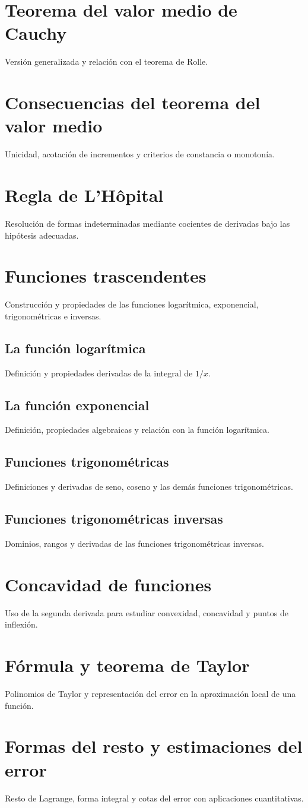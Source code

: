 \section{Teorema del valor medio de Cauchy}
Versión generalizada y relación con el teorema de Rolle.

\section{Consecuencias del teorema del valor medio}
Unicidad, acotación de incrementos y criterios de constancia o monotonía.

\section{Regla de L'Hôpital}
Resolución de formas indeterminadas mediante cocientes de derivadas bajo las hipótesis adecuadas.

\section{Funciones trascendentes}
Construcción y propiedades de las funciones logarítmica, exponencial, trigonométricas e inversas.

\subsection{La función logarítmica}
Definición y propiedades derivadas de la integral de $1/x$.

\subsection{La función exponencial}
Definición, propiedades algebraicas y relación con la función logarítmica.

\subsection{Funciones trigonométricas}
Definiciones y derivadas de seno, coseno y las demás funciones trigonométricas.

\subsection{Funciones trigonométricas inversas}
Dominios, rangos y derivadas de las funciones trigonométricas inversas.

\section{Concavidad de funciones}
Uso de la segunda derivada para estudiar convexidad, concavidad y puntos de inflexión.

\section{Fórmula y teorema de Taylor}
Polinomios de Taylor y representación del error en la aproximación local de una función.

\section{Formas del resto y estimaciones del error}
Resto de Lagrange, forma integral y cotas del error con aplicaciones cuantitativas.
